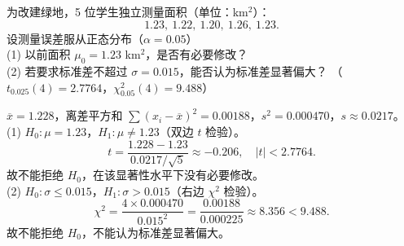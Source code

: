 ﻿\documentclass[lang=cn,11pt]{elegantbook}
\begin{document}
\begin{exercise} \label{ex:ht_combo}
为改建绿地，5 位学生独立测量面积（单位：km\(^2\)）：
\[
1.23,\ 1.22,\ 1.20,\ 1.26,\ 1.23.
\]
设测量误差服从正态分布（\(\alpha=0.05\)）\\
(1) 以前面积 \(\mu_0=1.23\) km\(^2\)，是否有必要修改？\\
(2) 若要求标准差不超过 \(\sigma=0.015\)，能否认为标准差显著偏大？
（\(t_{0.025}(4)=2.7764\)，\(\chi^2_{0.05}(4)=9.488\)）
\end{exercise}
\begin{solution}
\(\overline{x}=1.228\)，离差平方和 \(\sum(x_i-\overline{x})^2=0.00188\)，\(s^2=0.000470\)，\(s\approx0.0217\)。\\
(1) \(H_0\colon\mu=1.23\)，\(H_1\colon\mu\neq1.23\)（双边 \(t\) 检验）。
\[
t=\frac{1.228-1.23}{0.0217/\sqrt{5}}\approx-0.206,\quad |t|<2.7764.
\]
故不能拒绝 \(H_0\)，在该显著性水平下没有必要修改。\\
(2) \(H_0\colon\sigma\leq0.015\)，\(H_1\colon\sigma>0.015\)（右边 \(\chi^2\) 检验）。
\[
\chi^2=\frac{4\times0.000470}{0.015^2}=\frac{0.00188}{0.000225}\approx8.356<9.488.
\]
故不能拒绝 \(H_0\)，不能认为标准差显著偏大。
\end{solution}
\end{document}
